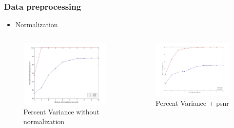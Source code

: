 \documentclass{beamer}
\begin{document}
\begin{frame}
\frametitle{Data preprocessing}

	\begin{itemize}
		\item Normalization
	\end{itemize}


 \begin{columns}
		\begin{column}{6cm}
			\begin{figure}
	\includegraphics[scale=0.17]{images/PCs+psnr_row} 
	\caption{Percent Variance without normalization}
\end{figure}
		\end{column}
		\begin{column}{6cm}
			\begin{figure}
				\includegraphics[scale=0.2]{images/PCs+psnr} 
				\caption{Percent Variance + psnr}
			\end{figure}
		\end{column}
	\end{columns}

\end{frame} 
\end{document}
